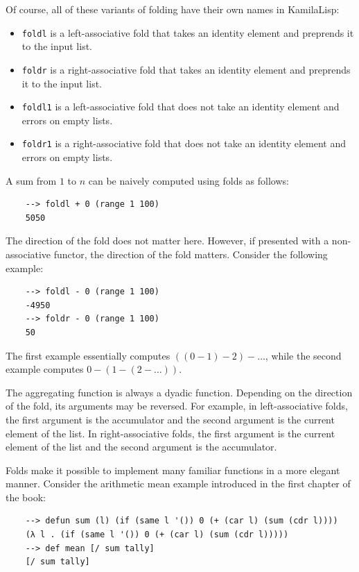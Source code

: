 Of course, all of these variants of folding have their own names in KamilaLisp:

\begin{itemize}
    \item \verb|foldl| is a left-associative fold that takes an identity element and preprends it to the input list.
    \item \verb|foldr| is a right-associative fold that takes an identity element and preprends it to the input list.
    \item \verb|foldl1| is a left-associative fold that does not take an identity element and errors on empty lists.
    \item \verb|foldr1| is a right-associative fold that does not take an identity element and errors on empty lists.
\end{itemize}

A sum from $1$ to $n$ can be naively computed using folds as follows:

\begin{Verbatim}
    --> foldl + 0 (range 1 100)
    5050
\end{Verbatim}

The direction of the fold does not matter here. However, if presented with a non-associative functor, the direction of the fold matters. Consider the following example:

\begin{Verbatim}
    --> foldl - 0 (range 1 100)
    -4950
    --> foldr - 0 (range 1 100)
    50
\end{Verbatim}

The first example essentially computes $((0 - 1) - 2) - \dots$, while the second example computes $0 - (1 - (2 - \dots))$.

The aggregating function is always a dyadic function. Depending on the direction of the fold, its arguments may be reversed. For example, in left-associative folds, the first argument is the accumulator and the second argument is the current element of the list. In right-associative folds, the first argument is the current element of the list and the second argument is the accumulator.

Folds make it possible to implement many familiar functions in a more elegant manner. Consider the arithmetic mean example introduced in the first chapter of the book:

\begin{Verbatim}
    --> defun sum (l) (if (same l '()) 0 (+ (car l) (sum (cdr l))))
    (λ l . (if (same l '()) 0 (+ (car l) (sum (cdr l)))))
    --> def mean [/ sum tally]
    [/ sum tally]
\end{Verbatim}

